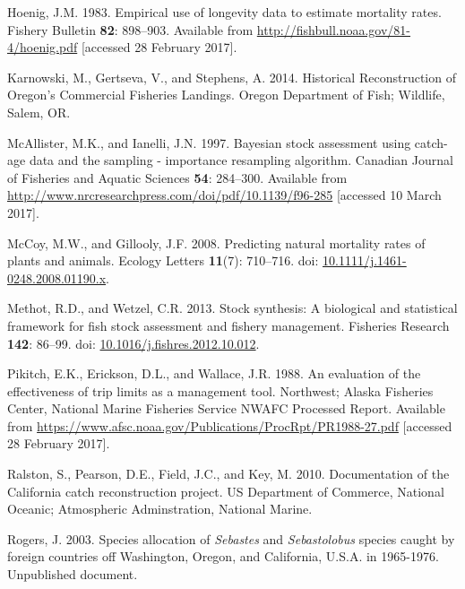 \documentclass[12pt,]{article}
\begin{document}
\hypertarget{ref-hoenig_empirical_1983}{}
Hoenig, J.M. 1983. Empirical use of longevity data to estimate mortality
rates. Fishery Bulletin \textbf{82}: 898--903. Available from
\url{http://fishbull.noaa.gov/81-4/hoenig.pdf} {[}accessed 28 February
2017{]}.

\hypertarget{ref-karnowski_historical_2014}{}
Karnowski, M., Gertseva, V., and Stephens, A. 2014. Historical
Reconstruction of Oregon's Commercial Fisheries Landings. Oregon
Department of Fish; Wildlife, Salem, OR.

\hypertarget{ref-mcallister_bayesian_1997}{}
McAllister, M.K., and Ianelli, J.N. 1997. Bayesian stock assessment
using catch-age data and the sampling - importance resampling algorithm.
Canadian Journal of Fisheries and Aquatic Sciences \textbf{54}:
284--300. Available from
\url{http://www.nrcresearchpress.com/doi/pdf/10.1139/f96-285}
{[}accessed 10 March 2017{]}.

\hypertarget{ref-mccoy_predicting_2008}{}
McCoy, M.W., and Gillooly, J.F. 2008. Predicting natural mortality rates
of plants and animals. Ecology Letters \textbf{11}(7): 710--716. doi:
\href{https://doi.org/10.1111/j.1461-0248.2008.01190.x}{10.1111/j.1461-0248.2008.01190.x}.

\hypertarget{ref-methot_stock_2013}{}
Methot, R.D., and Wetzel, C.R. 2013. Stock synthesis: A biological and
statistical framework for fish stock assessment and fishery management.
Fisheries Research \textbf{142}: 86--99. doi:
\href{https://doi.org/10.1016/j.fishres.2012.10.012}{10.1016/j.fishres.2012.10.012}.

\hypertarget{ref-pikitch_evaluation_1988}{}
Pikitch, E.K., Erickson, D.L., and Wallace, J.R. 1988. An evaluation of
the effectiveness of trip limits as a management tool. Northwest; Alaska
Fisheries Center, National Marine Fisheries Service NWAFC Processed
Report. Available from
\url{https://www.afsc.noaa.gov/Publications/ProcRpt/PR1988-27.pdf}
{[}accessed 28 February 2017{]}.

\hypertarget{ref-ralston_documentation_2010}{}
Ralston, S., Pearson, D.E., Field, J.C., and Key, M. 2010. Documentation
of the California catch reconstruction project. US Department of
Commerce, National Oceanic; Atmospheric Adminstration, National Marine.

\hypertarget{ref-rogers_species_2003}{}
Rogers, J. 2003. Species allocation of \emph{Sebastes} and
\emph{Sebastolobus} species caught by foreign countries off Washington,
Oregon, and California, U.S.A. in 1965-1976. Unpublished document.
\end{document}
